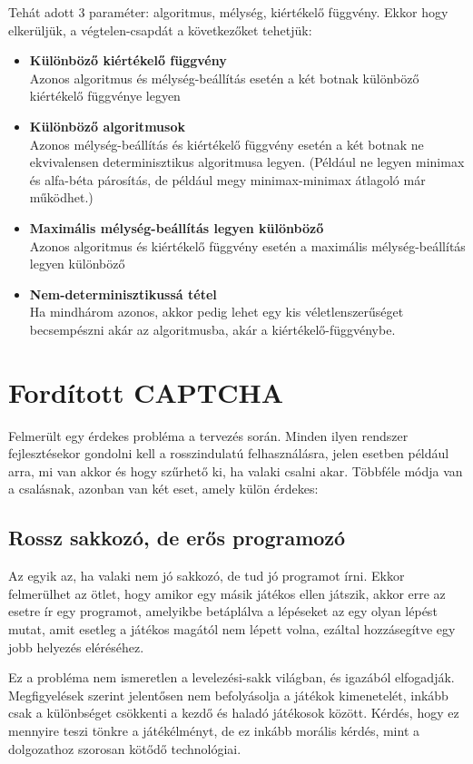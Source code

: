\documentclass[twoside, a4paper, 12pt]{book}
\begin{document}
Tehát adott 3 paraméter: algoritmus, mélység, kiértékelő függvény. Ekkor hogy elkerüljük, a végtelen-csapdát a következőket tehetjük:
\begin{itemize}
	\item \textbf{Különböző kiértékelő függvény} \\ 
	Azonos algoritmus és mélység-beállítás esetén a két botnak különböző kiértékelő függvénye legyen
	
	\item \textbf{Különböző algoritmusok} \\
	Azonos mélység-beállítás és kiértékelő függvény esetén a két botnak ne ekvivalensen determinisztikus algoritmusa legyen. (Például ne legyen minimax és alfa-béta párosítás, de például megy minimax-minimax átlagoló már működhet.)
	
	\item \textbf{Maximális mélység-beállítás legyen különböző} \\
	Azonos algoritmus és kiértékelő függvény esetén a maximális mélység-beállítás legyen különböző
	
	\item \textbf{Nem-determinisztikussá tétel} \\
	Ha mindhárom azonos, akkor pedig lehet egy kis véletlenszerűséget becsempészni akár az algoritmusba, akár a kiértékelő-függvénybe.
\end{itemize}

\section{Fordított CAPTCHA}
Felmerült egy érdekes probléma a tervezés során. Minden ilyen rendszer fejlesztésekor gondolni kell a rosszindulatú felhasználásra, jelen esetben például arra, mi van akkor és hogy szűrhető ki, ha valaki csalni akar. Többféle módja van a csalásnak, azonban van két eset, amely külön érdekes:
\subsection{Rossz sakkozó, de erős programozó}
Az egyik az, ha valaki nem jó sakkozó, de tud jó programot írni. Ekkor felmerülhet az ötlet, hogy amikor egy másik játékos ellen játszik, akkor erre az esetre ír egy programot, amelyikbe betáplálva a lépéseket az egy olyan lépést mutat, amit esetleg a játékos magától nem lépett volna, ezáltal hozzásegítve egy jobb helyezés eléréséhez.

Ez a probléma nem ismeretlen a levelezési-sakk világban, és igazából elfogadják. Megfigyelések szerint jelentősen nem befolyásolja a játékok kimenetelét, inkább csak a különbséget csökkenti a kezdő és haladó játékosok között. \cite{corrChessHelpHu} Kérdés, hogy ez mennyire teszi tönkre a játékélményt, de ez inkább morális kérdés, mint a dolgozathoz szorosan kötődő technológiai.
\end{document}
